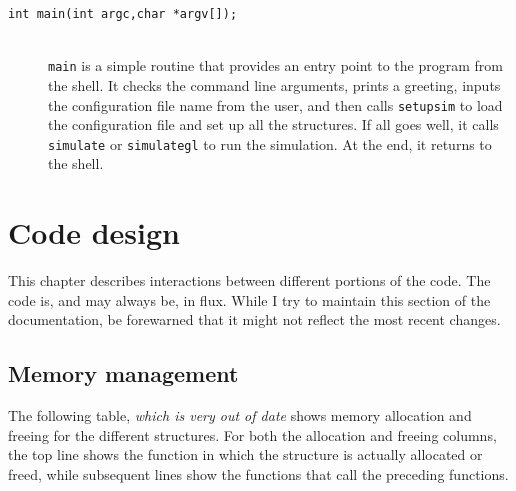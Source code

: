 \documentclass {book}
\begin{document}
\begin{description}

\item[\texttt{int main(int argc,char *argv[]);}]
\hfill \\
\texttt{main} is a simple routine that provides an entry point to the program from the shell. It checks the command line arguments, prints a greeting, inputs the configuration file name from the user, and then calls \texttt{setupsim} to load the configuration file and set up all the structures. If all goes well, it calls \texttt{simulate} or \texttt{simulategl} to run the simulation. At the end, it returns to the shell.

\end{description}

\chapter{Code design}

This chapter describes interactions between different portions of the code. The code is, and may always be, in flux. While I try to maintain this section of the documentation, be forewarned that it might not reflect the most recent changes.

\section{Memory management}

The following table, \emph{which is very out of date} shows memory allocation and freeing for the different structures. For both the allocation and freeing columns, the top line shows the function in which the structure is actually allocated or freed, while subsequent lines show the functions that call the preceding functions.
\end{document}
